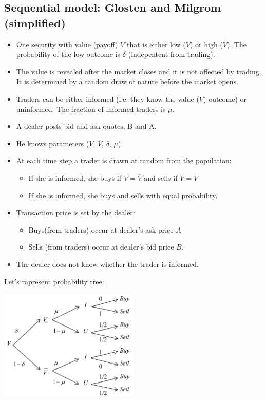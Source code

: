 \subsection{Sequential model: Glosten and Milgrom (simplified)}
\begin{mysetting}
	\begin{itemize}
		\item One security with value (payoff) $V$ that is either low (\underline{$V$}) or high ($\overline{V}$). The probability of the low outcome is $\delta$ (indepentent from trading).
		\item The value is revealed after the market closes and it is not affected by trading.  It is determined by a random draw of nature before the market opens.
		\item Traders can be either informed (i.e. they know the value ($V$) outcome) or
		uninformed. The fraction of informed traders is $\mu$.
		\item A dealer posts bid and ask quotes, B and A.
		\item  He knows parameters (\underline{$V$}, $\overline{V}$, $\delta$, $\mu$)
		\item At each time step a trader is drawn at random from the population:
		\begin{itemize}
			\item If she is informed, she buys if $V = \overline{V}$ and sells if $V =$\underline{$V$}
			\item If she is informed, she buys and sells with equal probability.
		\end{itemize}
	   \item Transaction price is set by the dealer:
	   \begin{itemize}
	   	\item Buys(from traders) occur at dealer's ask price $A$
	   	\item Sells (from traders) occur at dealer's bid price $B$.
	   \end{itemize}
   \item The dealer does not know whether the trader is informed.
	\end{itemize}
\end{mysetting}
Let's rapresent probability tree:
	\begin{center}
		\includegraphics[width=0.5\textwidth]{picture/(3)prob_tree.png}
	\end{center}

